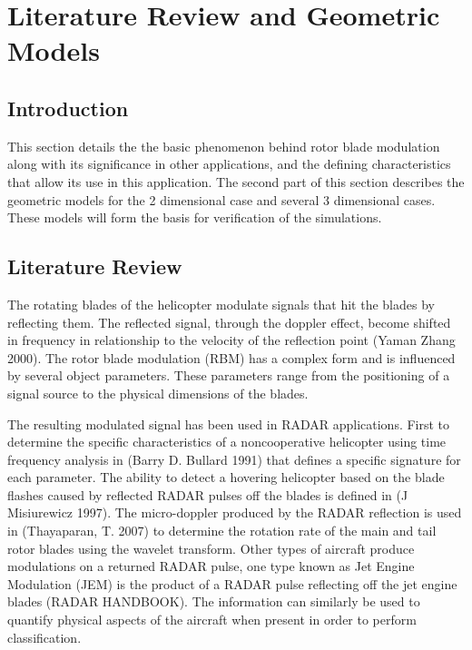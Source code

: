 \chapter{Literature Review and Geometric Models} \label{ch:background}

\section{Introduction}
This section details the the basic phenomenon behind rotor blade modulation along with its significance in other applications, and the defining characteristics that allow its use in this application. The second part of this section describes the geometric models for the 2 dimensional case and several 3 dimensional cases. These models will form the basis for verification of the simulations.

\section{Literature Review}
The rotating blades of the helicopter modulate signals that hit the blades by reflecting them. The reflected signal, through the doppler effect, become shifted in frequency in relationship to the velocity of the reflection point (Yaman Zhang 2000). The rotor blade modulation (RBM) has a complex form and is influenced by several object parameters. These parameters range from the positioning of a signal source to the physical dimensions of the blades. 

The resulting modulated signal has been used in RADAR applications. First to determine the specific characteristics of a noncooperative helicopter using time frequency analysis in (Barry D. Bullard 1991) that defines a specific signature for each parameter. The ability to detect a hovering helicopter based on the blade flashes caused by reflected RADAR pulses off the blades is defined in (J Misiurewicz 1997). The micro-doppler produced by the RADAR reflection is used in (Thayaparan, T. 2007) to determine the rotation rate of the main and tail rotor blades using the wavelet transform. Other types of aircraft produce modulations on a returned RADAR pulse, one type known as Jet Engine Modulation (JEM) is the product of a RADAR pulse reflecting off the jet engine blades (RADAR HANDBOOK). The information can similarly be used to quantify physical aspects of the aircraft when present in order to perform classification.

